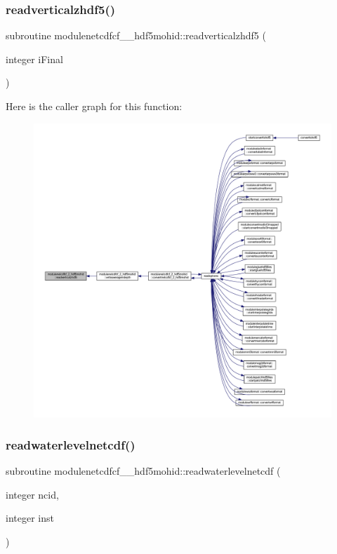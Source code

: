 \subsubsection{\texorpdfstring{readverticalzhdf5()}{readverticalzhdf5()}}
{\footnotesize\ttfamily subroutine modulenetcdfcf\+\_\+\_\+hdf5mohid\+::readverticalzhdf5 (\begin{DoxyParamCaption}\item[{integer}]{i\+Final }\end{DoxyParamCaption})\hspace{0.3cm}{\ttfamily [private]}}

Here is the caller graph for this function\+:\nopagebreak
\begin{figure}[H]
\begin{center}
\leavevmode
\includegraphics[width=350pt]{namespacemodulenetcdfcf__2__hdf5mohid_a5ea0bf1216f1cdc72e51ebf22b85884e_icgraph}
\end{center}
\end{figure}
\mbox{\label{namespacemodulenetcdfcf__2__hdf5mohid_a09c9e8d6a98c36d9bf0fe0c733ded2ce}} 
\subsubsection{\texorpdfstring{readwaterlevelnetcdf()}{readwaterlevelnetcdf()}}
{\footnotesize\ttfamily subroutine modulenetcdfcf\+\_\+\_\+hdf5mohid\+::readwaterlevelnetcdf (\begin{DoxyParamCaption}\item[{integer}]{ncid,  }\item[{integer}]{inst }\end{DoxyParamCaption})\hspace{0.3cm}{\ttfamily [private]}}

